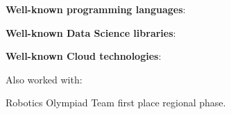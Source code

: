 
\textbf{Well-known programming languages}:
\begin{center}
\end{center}
\divider{}

\textbf{Well-known Data Science libraries}:
\begin{center}
\end{center}
\divider{}

\textbf{Well-known Cloud technologies}:
\begin{center}
\end{center}
\divider{}

Also worked with:
\begin{center}
\end{center}
\divider{}


\cvachievement{\faTrophy}
{Robotics Olympiad \smallskip}
{\small{}%
  \small{}}
Team first place regional phase.

\medskip


%
\divider{}

%
\divider{}

%
\divider{}

%

